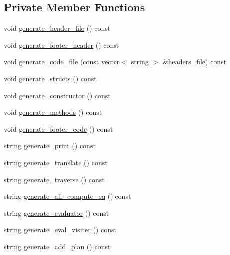 \subsection*{Private Member Functions}
\begin{CompactItemize}
\item 
void \hyperlink{classgenevalmag_1_1Builder__code_62d38d96676f0a11a377c19991bf4e90}{generate\_\-header\_\-file} () const 
\item 
void \hyperlink{classgenevalmag_1_1Builder__code_5f3ad7619822680e0f2a79d7c26af776}{generate\_\-footer\_\-header} () const 
\item 
void \hyperlink{classgenevalmag_1_1Builder__code_67439b5f2c7cd855e17a0fb91317a1d2}{generate\_\-code\_\-file} (const vector$<$ string $>$ \&headers\_\-file) const 
\item 
void \hyperlink{classgenevalmag_1_1Builder__code_5dcd144389b5612a328fede4317d414f}{generate\_\-structs} () const 
\item 
void \hyperlink{classgenevalmag_1_1Builder__code_c390149dae2358dda72ff8360f30c693}{generate\_\-constructor} () const 
\item 
void \hyperlink{classgenevalmag_1_1Builder__code_81b67543752446840e23c8b8fd3b9e7a}{generate\_\-methods} () const 
\item 
void \hyperlink{classgenevalmag_1_1Builder__code_f334d372096a958000bd0b53360223ab}{generate\_\-footer\_\-code} () const 
\item 
string \hyperlink{classgenevalmag_1_1Builder__code_d88294497280bb904ff3269b00446bc8}{generate\_\-print} () const 
\item 
string \hyperlink{classgenevalmag_1_1Builder__code_b8a711e35ef2a06238854398ce9ed0e6}{generate\_\-translate} () const 
\item 
string \hyperlink{classgenevalmag_1_1Builder__code_1b3412a660f7d69345932171709cf6d6}{generate\_\-traverse} () const 
\item 
string \hyperlink{classgenevalmag_1_1Builder__code_8052b85fae1b226af5fb65c2d548f432}{generate\_\-all\_\-compute\_\-eq} () const 
\item 
string \hyperlink{classgenevalmag_1_1Builder__code_ab8e30a2b842ad236a2bd70149839004}{generate\_\-evaluator} () const 
\item 
string \hyperlink{classgenevalmag_1_1Builder__code_d40103cc1f4217fdba2924ed1e29efdc}{generate\_\-eval\_\-visiter} () const 
\item 
string \hyperlink{classgenevalmag_1_1Builder__code_f62cdc4b1ad2302cd368e1b3c4fb99d9}{generate\_\-add\_\-plan} () const 

\end{CompactItemize}
